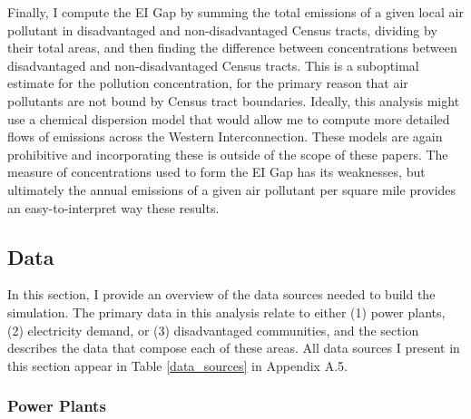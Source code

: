 Finally, I compute the EI Gap by summing the total emissions of a given local air pollutant in disadvantaged and non-disadvantaged Census tracts, dividing by their total areas, and then finding the difference between concentrations between disadvantaged and non-disadvantaged Census tracts. This is a suboptimal estimate for the pollution concentration, for the primary reason that air pollutants are not bound by Census tract boundaries. Ideally, this analysis might use a chemical dispersion model that would allow me to compute more detailed flows of emissions across the Western Interconnection. These models are again prohibitive and incorporating these is outside of the scope of these papers. The measure of concentrations used to form the EI Gap has its weaknesses, but ultimately the annual emissions of a given air pollutant per square mile provides an easy-to-interpret way these results. 


\subsection{Data}

In this section, I provide an overview of the data sources needed to build the simulation. The primary data in this analysis relate to either (1) power plants, (2) electricity demand, or (3) disadvantaged communities, and the section describes the data that compose each of these areas. All data sources I present in this section appear in Table \ref{data_sources} in Appendix A.5.

\subsubsection*{Power Plants}

